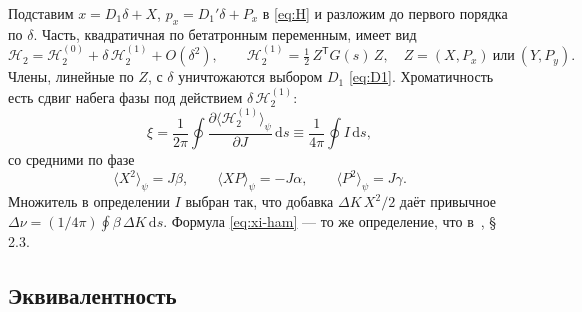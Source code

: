 Подставим $x=D_1\delta+X$, $p_x=D_1'\delta+P_x$ в \eqref{eq:H} и разложим до первого порядка по $\delta$. Часть, квадратичная по бетатронным переменным, имеет вид
\begin{equation}
\label{eq:H2}
\mathcal{H}_2=\mathcal{H}_2^{(0)}+\delta\,\mathcal{H}_2^{(1)}+O(\delta^2),
\qquad
\mathcal{H}_2^{(1)}=\tfrac12\,Z^{\mathsf T}G(s)\,Z,
\quad Z=(X,P_x)\ \text{или}\ (Y,P_y).
\end{equation}
Члены, линейные по $Z$, с $\delta$ уничтожаются выбором $D_1$ \eqref{eq:D1}. Хроматичность есть сдвиг набега фазы под действием $\delta\,\mathcal{H}_2^{(1)}$:
\begin{equation}
\label{eq:xi-ham}
\xi=\frac{1}{2\pi}\oint\frac{\partial\langle\mathcal{H}_2^{(1)}\rangle_\psi}{\partial J}\,\mathrm{d}s
\equiv\frac{1}{4\pi}\oint I\,\mathrm{d}s,
\end{equation}
со средними по фазе
\begin{equation}
\label{eq:avg}
\langle X^2\rangle_\psi=J\beta,
\qquad
\langle XP\rangle_\psi=-J\alpha,
\qquad
\langle P^2\rangle_\psi=J\gamma.
\end{equation}
Множитель в определении $I$ выбран так, что добавка $\Delta K\,X^2/2$ даёт привычное $\Delta\nu=(1/4\pi)\oint\beta\,\Delta K\,\mathrm{d}s$. Формула \eqref{eq:xi-ham} --- то же определение, что в~\cite{EqNote}, \S\,2.3.

\subsection{Эквивалентность}

